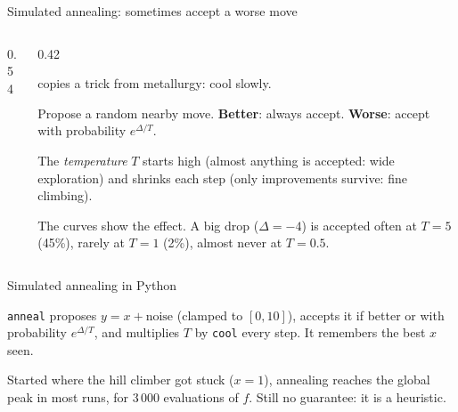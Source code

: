 \documentclass[aspectratio=169,10pt]{beamer}
\begin{document}
\begin{frame}{Simulated annealing: sometimes accept a worse move}
\begin{columns}[T]
\begin{column}{0.54\textwidth}
\begin{sfig}[0.8]
\end{sfig}
\end{column}
\begin{column}{0.42\textwidth}
{\small
{} copies a trick from metallurgy: cool slowly.

\vspace{1mm}
Propose a random nearby move. \textbf{Better}: always accept. \textbf{Worse}: accept with probability $e^{\Delta/T}$.

\vspace{1mm}
The \emph{temperature} $T$ starts high (almost anything is accepted: wide exploration) and shrinks each step (only improvements survive: fine climbing).

\vspace{1mm}
The curves show the effect. A big drop ($\Delta=-4$) is accepted often at $T=5$ (45\%), rarely at $T=1$ (2\%), almost never at $T=0.5$.}
\end{column}
\end{columns}
\end{frame}

\begin{frame}[allowframebreaks]{Simulated annealing in Python}
\framebreak
{}
\vspace{2mm}
{\small
\texttt{anneal} proposes $y=x+\text{noise}$ (clamped to $[0,10]$), accepts it if better or with probability $e^{\Delta/T}$, and multiplies $T$ by \texttt{cool} every step. It remembers the best $x$ seen.

\vspace{2mm}
Started where the hill climber got stuck ($x=1$), annealing reaches the global peak in most runs, for 3\,000 evaluations of $f$. Still no guarantee: it is a heuristic.}
\end{frame}
\end{document}

